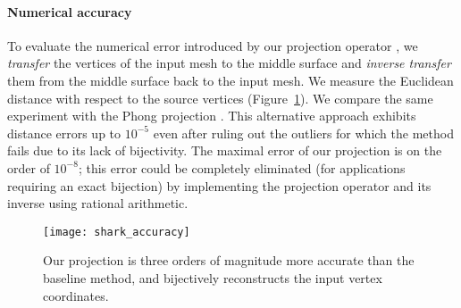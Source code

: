 \paragraph{Numerical accuracy} 
To evaluate the numerical error introduced by  our projection operator , we \emph{transfer} the vertices of the input mesh to the middle surface and \emph{inverse transfer} them from the middle surface back to the input mesh.  We measure the Euclidean distance with respect to the source vertices (Figure~\ref{fig:shark_accuracy}). 
We compare the same experiment with the Phong projection \cite{kobbelt1998interactive}. This alternative approach exhibits distance errors up to $10^{-5}$ even after ruling out the outliers for which the method fails due to its lack of bijectivity.  The maximal error of our projection is on the order of $10^{-8}$; this error could be completely eliminated (for applications requiring an exact bijection) by implementing the projection operator and its inverse using rational arithmetic.
\begin{figure}
    \centering
    \texttt{[image: shark\_accuracy]}
    \caption{Our projection is three orders of magnitude more accurate than the baseline method, and bijectively reconstructs the input vertex coordinates.}
    \label{fig:shark_accuracy}
    
\end{figure}
